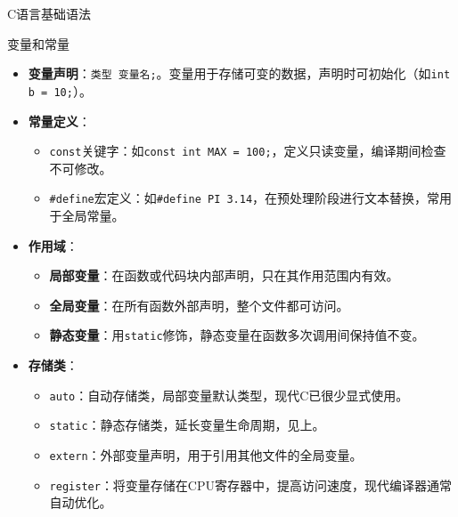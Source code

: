 \documentclass[UTF8,aspectratio=169]{beamer}
\begin{document}
\begin{frame}{C语言基础语法}
    \begin{ytublock}{变量和常量}
        \small
        \begin{itemize}
            \item \textbf{变量声明}：\texttt{类型 变量名;}。变量用于存储可变的数据，声明时可初始化（如\texttt{int b = 10;}）。
            \item \textbf{常量定义}：
            \begin{itemize}
                \item \texttt{const}关键字：如\texttt{const int MAX = 100;}，定义只读变量，编译期间检查不可修改。
                \item \texttt{\#define}宏定义：如\texttt{\#define PI 3.14}，在预处理阶段进行文本替换，常用于全局常量。
            \end{itemize}
            \item \textbf{作用域}：
            \begin{itemize}
                \item \textbf{局部变量}：在函数或代码块内部声明，只在其作用范围内有效。
                \item \textbf{全局变量}：在所有函数外部声明，整个文件都可访问。
                \item \textbf{静态变量}：用\texttt{static}修饰，静态变量在函数多次调用间保持值不变。
            \end{itemize}
            \item \textbf{存储类}：
            \begin{itemize}
                \item \texttt{auto}：自动存储类，局部变量默认类型，现代C已很少显式使用。
                \item \texttt{static}：静态存储类，延长变量生命周期，见上。
                \item \texttt{extern}：外部变量声明，用于引用其他文件的全局变量。
                \item \texttt{register}：将变量存储在CPU寄存器中，提高访问速度，现代编译器通常自动优化。
            \end{itemize}
        \end{itemize}
    \end{ytublock}
\end{frame}
\end{document}
